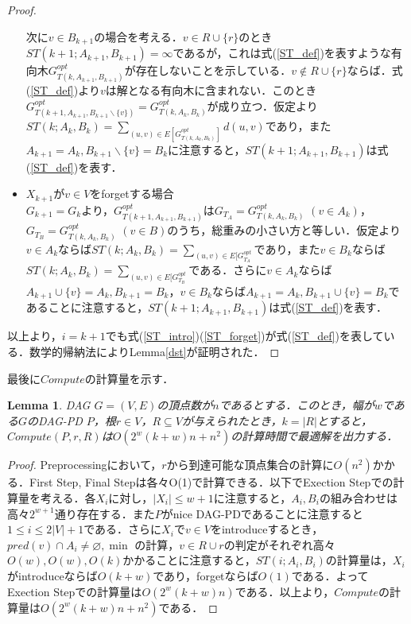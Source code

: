 \documentclass[master]{kuisthesis}		%
\theoremstyle{plain}
\newtheorem{lemma}{Lemma}
\theoremstyle{definition}
\begin{document}
\begin{proof}
\begin{itemize}
        次に$v \in B_{k+1}$の場合を考える．$v \in R \cup \{r\}$のとき$ST(k+1; A_{k+1}, B_{k+1}) = \infty$であるが，これは式(\ref{ST_def})を表すような有向木$G^{opt}_{T(k, A_{k+1}, B_{k+1})}$が存在しないことを示している．$v \notin R \cup \{r\}$ならば．式(\ref{ST_def})より$v$は解となる有向木に含まれない．このとき$G^{opt}_{T(k+1, A_{k+1}, B_{k+1} \backslash \{v\})} = G^{opt}_{T(k, A_k, B_k)}$が成り立つ．仮定より$ST(k; A_k, B_k) = \sum_{(u, v) \in E[G^{opt}_{T(k, A_k, B_k)}]} d(u, v)$であり，また$A_{k+1} = A_k, B_{k+1} \backslash \{v\} = B_k$に注意すると，$ST(k+1; A_{k+1}, B_{k+1})$は式(\ref{ST_def})を表す．
        
        \item $X_{k+1}$が$v \in V$をforgetする場合 \\
        $G_{k+1} = G_k$より，$G^{opt}_{T(k+1, A_{k+1}, B_{k+1})}$は$G_{T_A} = G^{opt}_{T(k, A_k, B_k)}$ $(v \in A_k)$，$G_{T_B} = G^{opt}_{T(k, A_k, B_k)}$ $(v \in B)$のうち，総重みの小さい方と等しい．仮定より$v \in A_k$ならば$ST(k; A_k, B_k) = \sum_{(u, v) \in E[G^{opt}_{T_A}}$であり，また$v \in B_k$ならば$ST(k; A_k, B_k) = \sum_{(u, v) \in E[G^{opt}_{T_B}}$である．さらに$v \in A_k$ならば$A_{k+1} \cup \{v\} = A_k, B_{k+1} = B_k$，$v \in B_k$ならば$A_{k+1} = A_k, B_{k+1} \cup \{v\} = B_k$であることに注意すると，$ST(k+1; A_{k+1}, B_{k+1})$は式(\ref{ST_def})を表す．
    \end{itemize}
    以上より，$i = k+1$でも式(\ref{ST_intro})(\ref{ST_forget})が式(\ref{ST_def})を表している．数学的帰納法によりLemma\ref{dst}が証明された．
\end{proof}




最後に$Compute$の計算量を示す．

\begin{lemma}
    DAG $G = (V, E)$の頂点数が$n$であるとする．このとき，幅が$w$である$G$のDAG-PD $P$，根$r \in V$，$R \subseteq V$が与えられたとき，$k = |R|$とすると，$Compute(P, r, R)$は$O(2^w(k+w)n + n^2)$の計算時間で最適解を出力する．
\end{lemma}

\begin{proof}
    Preprocessingにおいて，$r$から到達可能な頂点集合の計算に$O(n^2)$かかる．First Step, Final Stepは各々O(1)で計算できる．以下でExection Stepでの計算量を考える．各$X_i$に対し，$|X_i| \leq w + 1$に注意すると，$A_i, B_i$の組み合わせは高々$2^{w+1}$通り存在する．また$P$がnice DAG-PDであることに注意すると$1 \leq i \leq 2|V|+1$である．さらに$X_i$で$v \in V$をintroduceするとき，$pred(v) \cap A_i \neq \varnothing, \min$ の計算，$v \in R \cup {r}$の判定がそれぞれ高々$O(w), O(w), O(k)$かかることに注意すると，$ST(i; A_i, B_i)$の計算量は，$X_i$がintroduceならば$O(k+w)$であり，forgetならば$O(1)$である．よってExection Stepでの計算量は$O(2^w(k+w)n)$である．以上より，$Compute$の計算量は$O(2^w(k+w)n + n^2)$である．
\end{proof}
\end{document}

